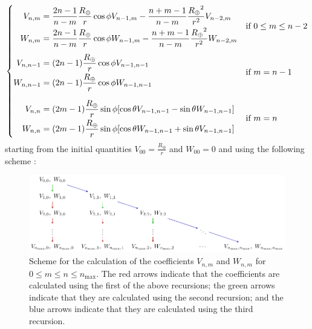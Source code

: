 \documentclass[../main.tex]{subfiles}
\begin{document}
\begin{align*}
  \begin{cases}
    \hspace{8pt}\begin{aligned}
                  V_{n,m} & =\frac{2n-1}{n-m} \frac{R_\oplus}{r}\cos\phi V_{n-1,m}-\frac{n+m-1}{n-m}\frac{{R_\oplus}^2}{r^2}V_{n-2,m} \\[0.1cm]
                  W_{n,m} & =\frac{2n-1}{n-m} \frac{R_\oplus}{r}\cos\phi W_{n-1,m}-\frac{n+m-1}{n-m}\frac{{R_\oplus}^2}{r^2}W_{n-2,m}
                \end{aligned} & \text{if $0\leq m\leq n-2$} \\[0.9cm]
    \begin{aligned}
      V_{n,n-1} & =(2n-1) \frac{R_\oplus}{r}\cos\phi V_{n-1,n-1} \\[0.1cm]
      W_{n,n-1} & =(2n-1) \frac{R_\oplus}{r}\cos\phi W_{n-1,n-1}
    \end{aligned}                                                                                       & \text{if $m=n-1$}                                               \\[0.9cm]
    \hspace{10.25pt}\begin{aligned}
                      V_{n,n} & =(2m-1)\frac{R_\oplus}{r}\sin\phi[\cos\theta V_{n-1,n-1}-\sin\theta W_{n-1,n-1}] \\[0.1cm]
                      W_{n,n} & =(2m-1)\frac{R_\oplus}{r}\sin\phi[\cos\theta W_{n-1,n-1}+\sin\theta V_{n-1,n-1}]
                    \end{aligned}                 & \text{if $m=n$}
  \end{cases}
\end{align*}
starting from the initial quantities $V_{00}= \frac{R_\oplus}{r}$ and $W_{00}= 0$ and using the following scheme \cite{montenbruck}:
\begin{figure}
  \centering
  \includegraphics[width=\textwidth]{Images/scheme_recursion.pdf}
  \caption{Scheme for the calculation of the coefficients $V_{n,m}$ and $W_{n,m}$ for $0\leq m\leq n\leq n_\mathrm{max}$. The red arrows indicate that the coefficients are calculated using the first of the above recursions; the green arrows indicate that they are calculated using the second recursion; and the blue arrows indicate that they are calculated using the third recursion.}
  \label{fig:SHcoeffs}
\end{figure}
\end{document}
